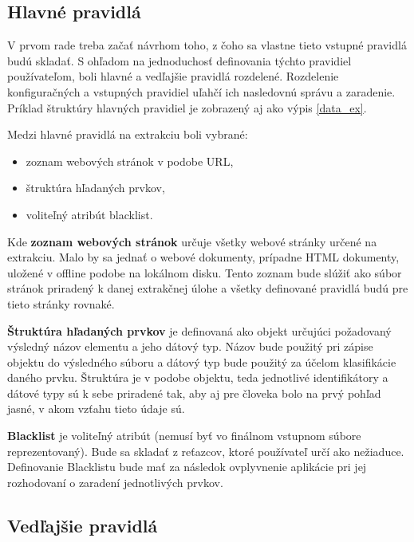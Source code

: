 \bigskip

\subsection{Hlavné pravidlá}

V prvom rade treba začať návrhom toho, z čoho sa vlastne tieto vstupné pravidlá budú skladať. S ohľadom na jednoduchosť definovania týchto pravidiel používateľom, boli hlavné a vedľajšie pravidlá rozdelené. Rozdelenie konfiguračných a vstupných pravidiel uľahčí ich nasledovnú správu a zaradenie. Príklad štruktúry hlavných pravidiel je zobrazený aj ako výpis \ref{data_ex}.

Medzi hlavné pravidlá na extrakciu boli vybrané:
\begin{itemize}
    \item zoznam webových stránok v podobe URL,
    \item štruktúra hľadaných prvkov,
    \item voliteľný atribút blacklist.
\end{itemize}

\bigskip

Kde \textbf{zoznam webových stránok} určuje všetky webové stránky určené na extrakciu. Malo by sa jednať o webové dokumenty, prípadne HTML dokumenty, uložené v offline podobe na lokálnom disku. Tento zoznam bude slúžiť ako súbor stránok priradený k danej extrakčnej úlohe a všetky definované pravidlá budú pre tieto stránky rovnaké. 

\bigskip

\textbf{Štruktúra hľadaných prvkov} je definovaná ako objekt určujúci požadovaný výsledný názov elementu a jeho  dátový typ. Názov bude použitý pri zápise objektu do výsledného súboru a dátový typ bude použitý za účelom klasifikácie daného prvku. Štruktúra je v podobe objektu, teda jednotlivé identifikátory a dátové typy sú k sebe priradené tak, aby aj pre človeka bolo na prvý pohľad jasné, v akom vzťahu tieto údaje sú.

\bigskip

\textbf{Blacklist} je voliteľný atribút (nemusí byť vo finálnom vstupnom súbore reprezentovaný). Bude sa skladať z reťazcov, ktoré používateľ určí ako nežiaduce. Definovanie Blacklistu bude mať za následok ovplyvnenie aplikácie pri jej rozhodovaní o zaradení jednotlivých prvkov.


\subsection{Vedľajšie pravidlá}

